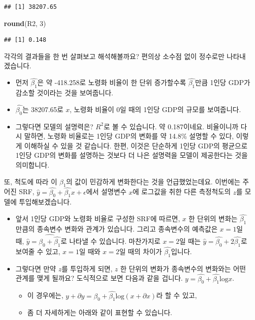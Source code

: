 \documentclass[
]{book}
\newenvironment{Shaded}{\begin{snugshade}}{\end{snugshade}}
\newcommand{\DecValTok}[1]{\textcolor[rgb]{0.00,0.00,0.81}{#1}}
\newcommand{\KeywordTok}[1]{\textcolor[rgb]{0.13,0.29,0.53}{\textbf{#1}}}
\newcommand{\NormalTok}[1]{#1}
\begin{document}
\begin{verbatim}
## [1] 38207.65
\end{verbatim}

\begin{Shaded}
\begin{Highlighting}[]
\KeywordTok{round}\NormalTok{(R2, }\DecValTok{3}\NormalTok{)}
\end{Highlighting}
\end{Shaded}

\begin{verbatim}
## [1] 0.148
\end{verbatim}

각각의 결과들을 한 번 살펴보고 해석해볼까요? 편의상 소수점 없이 정수로만 나타내겠습니다.

\begin{itemize}
\item
  먼저 \(\hat{\beta_1}\)은 약 -418.258로 노령화 비율이 한 단위 증가할수록 \(\hat{\beta_1}\)만큼 1인당 GDP가 감소할 것이라는 것을 보여줍니다.
\item
  \(\hat{\beta_0}\)는 38207.65로 \(x\), 노령화 비율이 0일 때의 1인당 GDP의 규모를 보여줍니다.
\item
  그렇다면 모델의 설명력은? \(R^2\)로 볼 수 있습니다. 약 0.187이네요. 비율이니까 다시 말하면, 노령화 비율로는 1인당 GDP의 변화를 약 14.8\% 설명할 수 있다, 이렇게 이해하실 수 있을 것 같습니다. 한편, 이것은 단순하게 1인당 GDP의 평균으로 1인당 GDP의 변화를 설명하는 것보다 더 나은 설명력을 모델이 제공한다는 것을 의미합니다.
\end{itemize}

또, 척도에 따라 이 \(\beta_1\)의 값이 민감하게 변화한다는 것을 언급했었는데요. 이번에는 주어진 SRF, \(\hat{y} = \hat{\beta_0} + \hat{\beta_1}x + \epsilon\)에서 설명변수 \(x\)에 로그값을 취한 다른 측정척도의 \(z\)를 모델에 투입해보겠습니다.

\begin{itemize}
\item
  앞서 1인당 GDP와 노령화 비율로 구성한 SRF에 따르면, \(x\) 한 단위의 변화는 \(\hat{\beta_1}\)만큼의 종속변수 변화와 관계가 있습니다. 그리고 종속변수의 예측값은 \(x=1\)일 때, \(\hat{y} = \hat{\beta_0 + \hat{\beta_1}}\)로 나타낼 수 있습니다. 마찬가지로 \(x=2\)일 때는 \(\hat{y} = \hat{\beta_0} + 2\hat{\beta_1}\)로 보여줄 수 있고, \(x=1\)일 때와 \(x=2\)일 때의 차이가 \(\hat{\beta_1}\)입니다.
\item
  그렇다면 만약 \(z\)를 투입하게 되면, \(z\) 한 단위의 변화가 종속변수의 변화와는 어떤 관계를 맺게 될까요? 도식적으로 보면 다음과 같을 겁니다. \(y = \hat{\beta_0} + \hat{\beta_1}\text{log}x\).

  \begin{itemize}
  \item
    이 경우에는, \(y + \partial y = \hat{\beta_0} + \hat{\beta_1}\text{log}(x + \partial x)\)라 할 수 있고,
  \item
    좀 더 자세하게는 아래와 같이 표현할 수 있습니다.
  \end{itemize}
\end{itemize}
\end{document}
